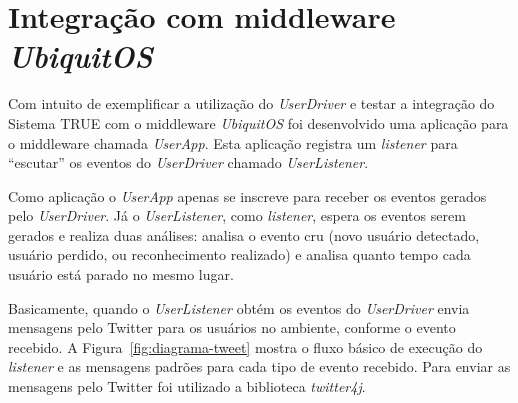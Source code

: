 \section{Integração com middleware \textit{UbiquitOS}}

	Com intuito de exemplificar a utilização do \textit{UserDriver} e testar a integração do Sistema TRUE com o middleware \textit{UbiquitOS} foi desenvolvido uma aplicação para o middleware chamada \textit{UserApp}. Esta aplicação registra um \textit{listener} para ``escutar'' os eventos do \textit{UserDriver} chamado \textit{UserListener}. 

	Como aplicação o \textit{UserApp} apenas se inscreve para receber os eventos gerados pelo \textit{UserDriver}. Já o \textit{UserListener}, como \textit{listener}, espera os eventos serem gerados e realiza duas análises: analisa o evento cru (novo usuário detectado, usuário perdido, ou reconhecimento realizado) e analisa quanto tempo cada usuário está parado no mesmo lugar.



	Basicamente, quando o \textit{UserListener} obtém os eventos do \textit{UserDriver} envia mensagens pelo Twitter para os usuários no ambiente, conforme o evento recebido. A Figura~\ref{fig:diagrama-tweet} mostra o fluxo básico de execução do \textit{listener} e as mensagens padrões para cada tipo de evento recebido. Para enviar as mensagens pelo Twitter foi utilizado a biblioteca \textit{twitter4j}. 

